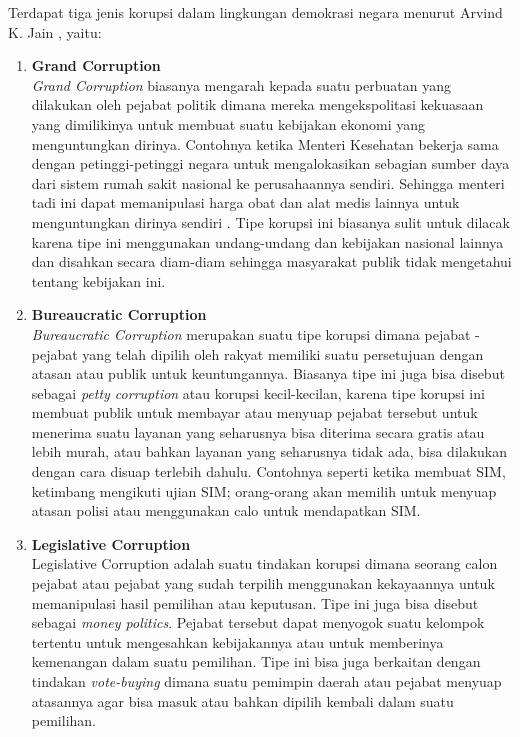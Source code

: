 \documentclass[11pt]{article}
\begin{document}
Terdapat tiga jenis korupsi dalam lingkungan demokrasi negara menurut Arvind K. Jain
\citep{jainCorruptionReview2001},
yaitu:
\begin{enumerate}
    \item \textbf{Grand Corruption} \\
          \emph{Grand Corruption} biasanya mengarah kepada suatu perbuatan yang dilakukan
          oleh pejabat politik dimana mereka mengekspolitasi kekuasaan yang dimilikinya
          untuk membuat suatu kebijakan ekonomi yang menguntungkan dirinya. Contohnya
          ketika Menteri Kesehatan bekerja sama dengan petinggi-petinggi negara untuk
          mengalokasikan sebagian sumber daya dari  sistem rumah sakit nasional ke perusahaannya 
          sendiri. Sehingga menteri tadi ini dapat memanipulasi harga obat dan alat medis
          lainnya untuk menguntungkan dirinya sendiri \citep{transparencyinternationalGrandCorruptionOur}. 
          Tipe korupsi ini biasanya sulit untuk dilacak karena tipe ini menggunakan
          undang-undang dan kebijakan nasional lainnya dan disahkan secara diam-diam 
          sehingga masyarakat publik tidak mengetahui tentang kebijakan ini.
          
    \item \textbf{Bureaucratic Corruption} \\ 
          \emph{Bureaucratic Corruption} merupakan suatu tipe korupsi dimana pejabat
          - pejabat yang telah dipilih oleh rakyat memiliki suatu persetujuan dengan atasan atau publik
          untuk keuntungannya. Biasanya tipe ini juga bisa disebut sebagai \emph{petty corruption}
          atau korupsi kecil-kecilan, karena tipe korupsi ini membuat publik untuk membayar atau
          menyuap pejabat tersebut untuk menerima suatu layanan yang seharusnya bisa diterima
          secara gratis atau lebih murah, atau bahkan layanan yang seharusnya tidak ada,
          bisa dilakukan dengan cara disuap terlebih dahulu. Contohnya seperti ketika membuat
          SIM, ketimbang mengikuti ujian SIM; orang-orang akan memilih untuk menyuap atasan polisi
          atau menggunakan calo untuk mendapatkan SIM.

    \item \textbf{Legislative Corruption} \\
          Legislative Corruption adalah suatu tindakan korupsi dimana seorang calon pejabat atau
          pejabat yang sudah terpilih menggunakan kekayaannya untuk memanipulasi hasil pemilihan atau keputusan.
          Tipe ini juga bisa disebut sebagai \emph{money politics}. Pejabat tersebut dapat menyogok
          suatu kelompok tertentu untuk mengesahkan kebijakannya atau untuk memberinya kemenangan dalam suatu
          pemilihan. Tipe ini bisa juga berkaitan dengan tindakan \emph{vote-buying} dimana suatu pemimpin daerah
          atau pejabat menyuap atasannya agar bisa masuk atau bahkan dipilih kembali dalam suatu pemilihan.
\end{enumerate}
\end{document}
